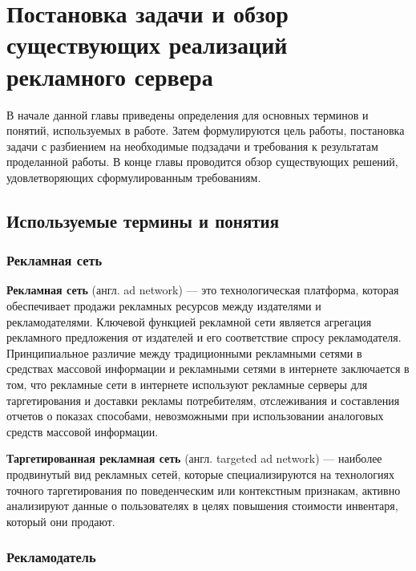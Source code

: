 \documentclass[times]{itmo-student-thesis}
\begin{document}

\chapter{Постановка задачи и обзор существующих реализаций рекламного сервера}\label{chapter:1}

\startrelatedwork %

В начале данной главы приведены определения для основных терминов и понятий, используемых в работе. Затем формулируются цель работы, постановка задачи с разбиением на необходимые подзадачи и требования к результатам проделанной работы. В конце главы проводится обзор существующих решений, удовлетворяющих сформулированным требованиям.

\section{Используемые термины и понятия}\label{sec:terms}

\subsection{Рекламная сеть}

\textbf{Рекламная сеть} (англ. ad network)\label{ad-network} — это технологическая платформа, которая обеспечивает продажи рекламных ресурсов между издателями и рекламодателями. Ключевой функцией рекламной сети является агрегация рекламного предложения от издателей и его соответствие спросу рекламодателя. Принципиальное различие между традиционными рекламными сетями в средствах массовой информации и рекламными сетями в интернете заключается в том, что рекламные сети в интернете используют рекламные серверы для таргетирования и доставки рекламы потребителям, отслеживания и составления отчетов о показах способами, невозможными при использовании аналоговых средств массовой информации.

\textbf{Таргетированная рекламная сеть} (англ. targeted ad network) — наиболее продвинутый вид рекламных сетей, которые специализируются на технологиях точного таргетирования по поведенческим или контекстным признакам, активно анализируют данные о пользователях в целях повышения стоимости инвентаря, который они продают.

\subsection{Рекламодатель}
\end{document}
